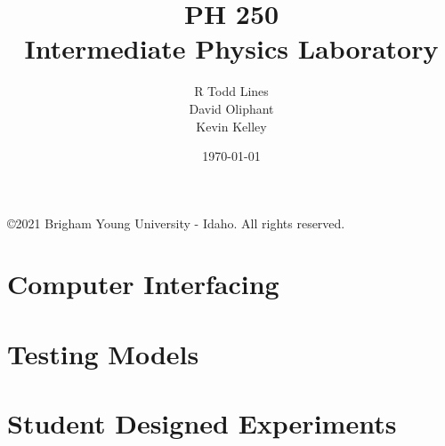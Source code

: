 \documentclass{book}
\title{{\Huge PH 250}\\
{\Huge {\Large Intermediate Physics Laboratory}}}
\author{R Todd Lines\\David Oliphant\\Kevin Kelley}
\date{\today}
\begin{document}
\frontmatter
\maketitle
\vspace*{\fill}
\copyright 2021 Brigham Young University - Idaho. All rights reserved.
\tableofcontents
\listoffigures




\mainmatter

\part{Computer Interfacing}
	
	
	
	
	

\part{Testing Models}
	
	
	
	


\part{Student Designed Experiments}
	
			
\end{document}
